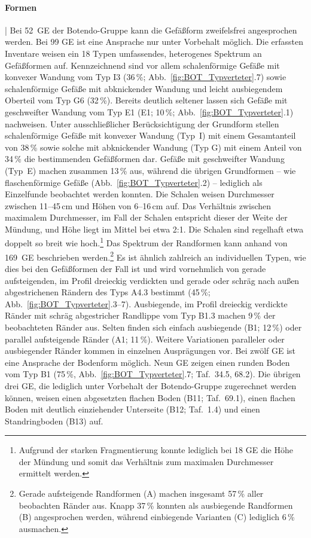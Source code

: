 \paragraph{Formen}\hspace{-.5em}|\hspace{.5em}%
Bei 52~GE der Botendo-Gruppe kann die Gefäßform zweifelsfrei angesprochen werden. Bei 99 GE ist eine Ansprache nur unter Vorbehalt möglich. Die erfassten Inventare weisen ein 18 Typen umfassendes, heterogenes Spektrum an Gefäßformen auf. Kennzeichnend sind vor allem schalenförmige Gefäße mit konvexer Wandung vom Typ I3 (36\,\%; Abb.~\ref{fig:BOT_Typverteter}.7) sowie schalenförmige Gefäße mit abknickender Wandung und leicht ausbiegendem Oberteil vom Typ G6 (32\,\%). Bereits deutlich seltener lassen sich Gefäße mit geschweifter Wandung vom Typ E1 (E1; 10\,\%; Abb.~\ref{fig:BOT_Typverteter}.1) nachweisen. Unter ausschließlicher Berücksichtigung der Grundform stellen schalenförmige Gefäße mit konvexer Wandung (Typ~I) mit einem Gesamtanteil von 38\,\% sowie solche mit abknickender Wandung (Typ G) mit einem Anteil von 34\,\% die bestimmenden Gefäßformen dar. Gefäße mit geschweifter Wandung (Typ~E) machen zusammen 13\,\% aus, während die übrigen Grundformen -- wie flaschenförmige Gefäße (Abb.~\ref{fig:BOT_Typverteter}.2) -- lediglich als Einzelfunde beobachtet werden konnten. Die Schalen weisen Durchmesser zwischen 11--45\,cm und Höhen von 6--16\,cm auf. Das Verhältnis zwischen maximalem Durchmesser, im Fall der Schalen entspricht dieser der Weite der Mündung, und Höhe liegt im Mittel bei etwa 2:1. Die Schalen sind regelhaft etwa doppelt so breit wie hoch.\footnote{Aufgrund der starken Fragmentierung konnte lediglich bei 18 GE die Höhe der Mündung und somit das Verhältnis zum maximalen Durchmesser ermittelt werden.} Das Spektrum der Randformen kann anhand von 169~GE beschrieben werden.\footnote{Gerade aufsteigende Randformen (A) machen insgesamt 57\,\% aller beobachten Ränder aus. Knapp 37\,\% konnten als ausbiegende Randformen (B) angesprochen werden, während einbiegende Varianten (C) lediglich 6\,\% ausmachen.} Es ist ähnlich zahlreich an individuellen Typen, wie dies bei den Gefäßformen der Fall ist und wird vornehmlich von gerade aufsteigenden, im Profil dreieckig verdickten und gerade oder schräg nach außen abgestrichenen Rändern des Typs A4.3 bestimmt (45\,\%; Abb.~\ref{fig:BOT_Typverteter}.3--7). Ausbiegende, im Profil dreieckig verdickte Ränder mit schräg abgestricher Randlippe vom Typ B1.3 machen 9\,\% der beobachteten Ränder aus. Selten finden sich einfach ausbiegende (B1; 12\,\%) oder parallel aufsteigende Ränder (A1; 11\,\%). Weitere Variationen paralleler oder ausbiegender Ränder kommen in einzelnen Ausprägungen vor. Bei zwölf GE ist eine Ansprache der Bodenform möglich. Neun GE zeigen einen runden Boden vom Typ B1 (75\,\%, Abb.~\ref{fig:BOT_Typverteter}.7; Taf.~34.5, 68.2). Die übrigen drei GE, die lediglich unter Vorbehalt der Botendo-Gruppe zugerechnet werden können, weisen einen abgesetzten flachen Boden (B11; Taf.~69.1), einen flachen Boden mit deutlich einziehender Unterseite (B12; Taf.~1.4) und einen Standringboden (B13) auf.

